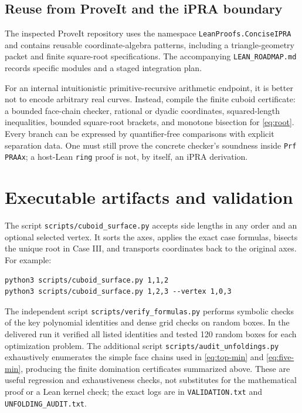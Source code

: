 \documentclass[11pt]{article}
\theoremstyle{definition}
\begin{document}
\subsection{Reuse from ProveIt and the iPRA boundary}

The inspected ProveIt repository \cite{proveit2026} uses the namespace
\texttt{LeanProofs.ConciseIPRA} and contains reusable coordinate-algebra
patterns, including a triangle-geometry packet and finite square-root
specifications.  The accompanying \texttt{LEAN\_ROADMAP.md} records specific
modules and a staged integration plan.

For an internal intuitionistic primitive-recursive arithmetic endpoint, it is
better not to encode arbitrary real curves.  Instead, compile the finite
cuboid certificate: a bounded face-chain checker, rational or dyadic
coordinates, squared-length inequalities, bounded square-root brackets, and
monotone bisection for \eqref{eq:root}.  Every branch can be expressed by
quantifier-free comparisons with explicit separation data.  One must still
prove the concrete checker's soundness inside \texttt{Prf PRAAx}; a host-Lean
\texttt{ring} proof is not, by itself, an iPRA derivation.

\section{Executable artifacts and validation}

The script \texttt{scripts/cuboid\_surface.py} accepts side lengths in any
order and an optional selected vertex.  It sorts the axes, applies the exact
case formulas, bisects the unique root in Case III, and transports coordinates
back to the original axes.  For example:
\begin{lstlisting}
python3 scripts/cuboid_surface.py 1,1,2
python3 scripts/cuboid_surface.py 1,2,3 --vertex 1,0,3
\end{lstlisting}

The independent script \texttt{scripts/verify\_formulas.py} performs symbolic
checks of the key polynomial identities and dense grid checks on random boxes.
In the delivered run it verified all listed identities and tested 120 random
boxes for each optimization problem.  The additional script
\texttt{scripts/audit\_unfoldings.py} exhaustively enumerates the simple face
chains used in \eqref{eq:top-min} and \eqref{eq:five-min}, producing the
finite domination certificates summarized above.  These are useful regression
and exhaustiveness checks, not substitutes for the mathematical proof or a
Lean kernel check; the exact logs are in \texttt{VALIDATION.txt} and
\texttt{UNFOLDING\_AUDIT.txt}.
\end{document}

